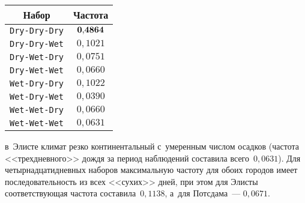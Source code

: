 \begin{multicols}{2}
{\begin{center}
\begin{minipage}[t]{38mm}
\tabcolsep=5.5pt
{\small
\begin{tabular}{|c|c|}
\hline
{Набор}&{Частота}\\
\hline
\verb"Dry-Dry-Dry"&$\bf 0{,}4864$\\
\verb"Dry-Dry-Wet"&$0{,}1021$\\
\verb"Dry-Wet-Dry"&$0{,}0751$\\
\verb"Dry-Wet-Wet"&$0{,}0660$\\
\verb"Wet-Dry-Dry"&$0{,}1022$\\
\verb"Wet-Dry-Wet"&$0{,}0390$\\
\verb"Wet-Wet-Dry"&$0{,}0660$\\
\verb"Wet-Wet-Wet"&$0{,}0631$\\
\hline
\end{tabular}}
\end{minipage}
\end{center}
}



\noindent
 в~Элисте климат
резко континентальный с~умеренным числом осадков (частота <<трехдневного>>
дождя за период наблюдений составила всего~$0{,}0631$). Для
четырнадцатидневных наборов максимальную час\-то\-ту для обоих городов имеет
последовательность из всех <<сухих>> дней, при этом для Элисты
соответствующая частота составила~$0{,}1138$, а~для Потсдама~--- $0{,}0671$.

\setcounter{table}{3}

\begin{table*}\small %
\begin{center}
\label{TabProbElista}
\vspace*{2ex}


\end{center}
\end{table*}
\end{multicols}
